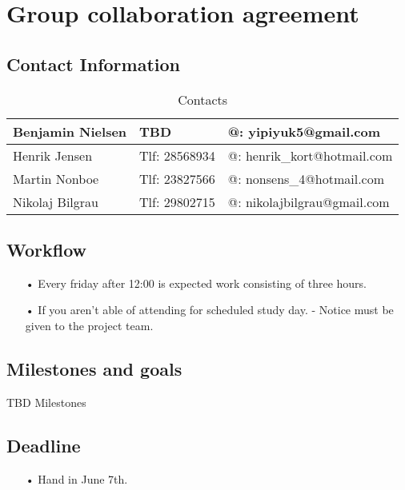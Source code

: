 \section{Group collaboration agreement}
\subsection{Contact Information}
\begin{table}[h!]
\centering
\caption{Contacts}
\label{Contact info}
\begin{tabular}{|l|l|l|}
\hline
Benjamin Nielsen & TBD           & @: yipiyuk5@gmail.com       \\ \hline
Henrik Jensen    & Tlf: 28568934 & @: henrik\_kort@hotmail.com \\ \hline
Martin Nonboe    & Tlf: 23827566 & @: nonsens\_4@hotmail.com   \\ \hline
Nikolaj Bilgrau  & Tlf: 29802715 & @: nikolajbilgrau@gmail.com \\ \hline
\end{tabular}
\end{table}

\subsection{Workflow}
\begin{enumerate}
	\item[•]Every friday after 12:00 is expected work consisting of three hours.   
	\item[•]If you aren’t able of attending for scheduled study day. - Notice must be given to the project team. 
\end{enumerate}

\subsection{Milestones and goals}
TBD Milestones

\subsection{Deadline}
\begin{enumerate}
	\item[•]Hand in June 7th.
\end{enumerate}
